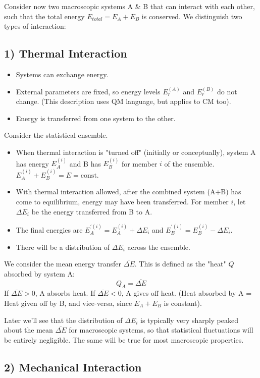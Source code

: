 \documentclass[11pt]{article}
\newcommand{\avg}[1]{\overline{#1}}
\begin{document}
Consider now two macroscopic systems A \& B that can interact with each other, such that the total energy $E_{total} = E_A + E_B$ is conserved.
We distinguish two types of interaction:

\subsection*{1) Thermal Interaction}

\begin{itemize}
    \item Systems can exchange energy.
    \item External parameters are fixed, so energy levels $E_r^{(A)}$ and $E_r^{(B)}$ do not change. (This description uses QM language, but applies to CM too).
    \item Energy is transferred from one system to the other.
\end{itemize}

Consider the statistical ensemble.
\begin{itemize}
    \item When thermal interaction is "turned off" (initially or conceptually), system A has energy $E_A^{(i)}$ and B has $E_B^{(i)}$ for member $i$ of the ensemble. $E_A^{(i)} + E_B^{(i)} = E = \text{const}$.
    \item With thermal interaction allowed, after the combined system (A+B) has come to equilibrium, energy may have been transferred. For member $i$, let $\Delta E_i$ be the energy transferred from B to A.
    \item The final energies are $E_A^{\prime (i)} = E_A^{(i)} + \Delta E_i$ and $E_B^{\prime (i)} = E_B^{(i)} - \Delta E_i$.
    \item There will be a distribution of $\Delta E_i$ across the ensemble.
\end{itemize}
We consider the mean energy transfer $\avg{\Delta E}$. This is defined as the "heat" $Q$ absorbed by system A:
\[ Q_A = \avg{\Delta E} \]
If $\avg{\Delta E} > 0$, A absorbs heat. If $\avg{\Delta E} < 0$, A gives off heat.
(Heat absorbed by A = Heat given off by B, and vice-versa, since $E_A+E_B$ is constant).

Later we'll see that the distribution of $\Delta E_i$ is typically very sharply peaked about the mean $\avg{\Delta E}$ for macroscopic systems, so that statistical fluctuations will be entirely negligible. The same will be true for most macroscopic properties.

\subsection*{2) Mechanical Interaction}
\end{document}
